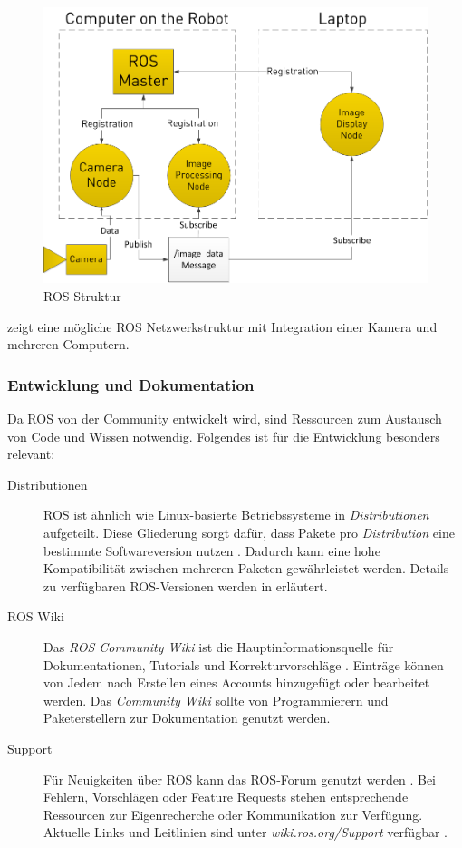 \begin{figure}[ht]
    \centering
    \includegraphics[width=\textwidth]{Bilder/ros_structure.png}
    \caption{ROS Struktur \cite{clearpath_robotics_intro_2015}}
    \label{fig:ros_structure}
\end{figure}

 zeigt eine mögliche \ac{ROS} Netzwerkstruktur mit Integration einer Kamera und mehreren Computern.

\subsubsection{Entwicklung und Dokumentation}

Da \ac{ROS} von der Community entwickelt wird, sind Ressourcen zum Austausch von Code und Wissen notwendig. Folgendes ist für die Entwicklung besonders relevant:

\begin{description}
    \item[Distributionen] \ac{ROS} ist ähnlich wie Linux-basierte Betriebssysteme in \textit{Distributionen} aufgeteilt. Diese Gliederung sorgt dafür, dass Pakete pro \textit{Distribution} eine bestimmte Softwareversion nutzen \cite[Absatz~3]{romero_rosconcepts_2014}. Dadurch kann eine hohe Kompatibilität zwischen mehreren Paketen gewährleistet werden. Details zu verfügbaren \ac{ROS}-Versionen werden in  erläutert.
    \item[\ac{ROS} Wiki] Das \textit{\ac{ROS} Community Wiki} ist die Hauptinformationsquelle für Dokumentationen, Tutorials und Korrekturvorschläge \cite[Absatz~3]{romero_rosconcepts_2014}. Einträge können von Jedem nach Erstellen eines Accounts hinzugefügt oder bearbeitet werden. Das \textit{Community Wiki} sollte von Programmierern und Paketerstellern zur Dokumentation genutzt werden.
    \item[Support] Für Neuigkeiten über \ac{ROS} kann das \ac{ROS}-Forum genutzt werden \cite[Absatz~2]{staples_support_2020}. Bei Fehlern, Vorschlägen oder Feature Requests stehen entsprechende Ressourcen zur Eigenrecherche oder Kommunikation zur Verfügung. Aktuelle Links und Leitlinien sind unter \textit{wiki.ros.org/Support} verfügbar \cite[Absatz~3-6]{staples_support_2020}.
\end{description}

